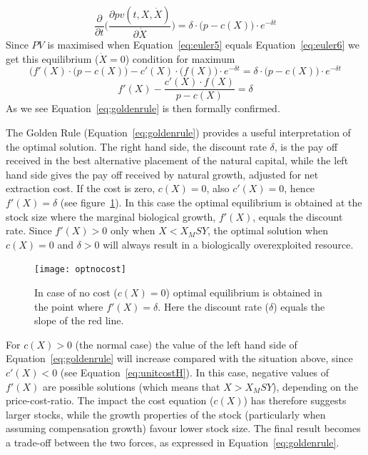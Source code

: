 \documentclass[11pt,fleqn]{book} %
\begin{document}
\begin{equation} 
\label{eq:euler6}
\frac{\partial }{\partial t} \bigg( \frac{\partial pv(t,X,\dot{X})}{\partial \dot{X}} \bigg) = \delta \cdot \Big( p - c(X) \Big) \cdot e^{-\delta t} 
\end{equation}
Since $PV$ is maximised when Equation~\ref{eq:euler5} equals Equation~\ref{eq:euler6} we get this equilibrium ($\dot{X} = 0$) condition for maximum
\begin{equation*} 
\label{eq:euler8}
\bigg(f'(X) \cdot \Big(p - c(X) \Big) - c'(X) \cdot (f(X) \bigg) \cdot e^{-\delta t} = \delta \cdot \Big( p - c(X) \Big) \cdot e^{-\delta t}
\end{equation*}
\begin{equation*} 
 f'(X) - \frac{c'(X) \cdot f(X)}{p - c(X)} = \delta
\end{equation*}
As we see Equation~\ref{eq:goldenrule} is then formally confirmed.

The Golden Rule (Equation~\ref{eq:goldenrule}) provides a useful interpretation of the optimal solution. The right hand side, the discount rate $\delta$, is the pay off received in the best alternative placement of the natural capital, while the left hand side gives the pay off received by natural growth, adjusted for net extraction cost. If the cost is zero, $c(X) = 0$, also $c'(X) = 0$, hence $f'(X) = \delta$ (see figure~\ref{fig:optnocost}). In this case the optimal equilibrium is obtained at the stock size where the marginal biological growth, $f'(X)$, equals the discount rate. Since $f'(X) > 0$ only when $X < X_MSY$, the optimal solution when $c(X) = 0$ and $\delta > 0$ will always result in a biologically overexploited resource.
\begin{figure}[ht]
\centering
\texttt{[image: optnocost]}
\caption{In case of no cost ($c(X) = 0$) optimal equilibrium is obtained in the point where $f'(X) = \delta$. Here the discount rate ($\delta$) equals the slope of the red line.}
\label{fig:optnocost}
\end{figure}
\hfill \break
For $c(X) > 0$ (the normal case) the value of the left hand side of Equation~\ref{eq:goldenrule} will increase compared with the situation above, since $c'(X) < 0$ (see Equation~\ref{eq:unitcostH}). In this case, negative values of $f'(X)$ are possible solutions (which means that $X > X_MSY$), depending on the price-cost-ratio. The impact the cost equation ($c(X)$) has therefore suggests larger stocks, while the growth properties of the stock (particularly when assuming compensation growth) favour lower stock size. The final result becomes a trade-off between the two forces, as expressed in Equation~\ref{eq:goldenrule}.
\end{document}
